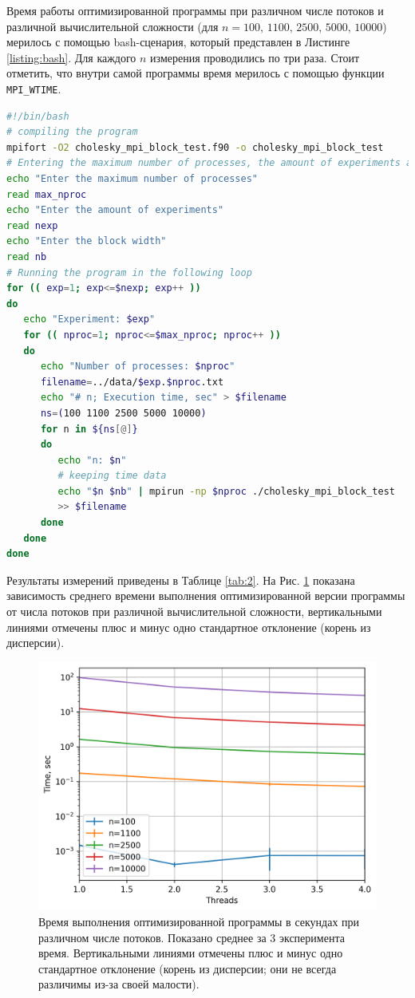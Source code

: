 Время работы оптимизированной программы при различном числе потоков и различной вычислительной сложности (для $n=100,\, 1100,\, 2500,\, 5000,\, 10000$) мерилось с помощью bash-сценария, который представлен в Листинге \ref{listing:bash}. Для каждого $n$ измерения проводились по три раза. Стоит отметить, что внутри самой программы время мерилось с помощью функции \texttt{MPI\_WTIME}.
\begin{lstlisting}[language=bash, style=fortran, caption={Сценарий запуска численных экспериментов на языке bash.}, label={listing:bash}]
#!/bin/bash
# compiling the program
mpifort -O2 cholesky_mpi_block_test.f90 -o cholesky_mpi_block_test
# Entering the maximum number of processes, the amount of experiments and the block width
echo "Enter the maximum number of processes"
read max_nproc
echo "Enter the amount of experiments"
read nexp
echo "Enter the block width"
read nb
# Running the program in the following loop
for (( exp=1; exp<=$nexp; exp++ ))
do
   echo "Experiment: $exp"
   for (( nproc=1; nproc<=$max_nproc; nproc++ ))
   do
      echo "Number of processes: $nproc"
      filename=../data/$exp.$nproc.txt
      echo "# n; Execution time, sec" > $filename
      ns=(100 1100 2500 5000 10000)
      for n in ${ns[@]}
      do
         echo "n: $n"
         # keeping time data
         echo "$n $nb" | mpirun -np $nproc ./cholesky_mpi_block_test 
         >> $filename
      done
   done
done
\end{lstlisting}
Результаты измерений приведены в Таблице \ref{tab:2}. На Рис. \ref{fig:t_vs_threads} показана зависимость среднего времени выполнения оптимизированной версии программы от числа потоков при различной вычислительной сложности, вертикальными линиями отмечены плюс и минус одно стандартное отклонение (корень из дисперсии). 
\begin{figure}[htbp]
    \centering
    \includegraphics[scale=0.75]{fig/t_vs_threads.png}
    \caption{Время выполнения оптимизированной программы в секундах при различном числе потоков. Показано среднее за 3 эксперимента время. Вертикальными линиями отмечены плюс и минус одно стандартное отклонение (корень из дисперсии; они не всегда различимы из-за своей малости).}
    \label{fig:t_vs_threads}
\end{figure}

